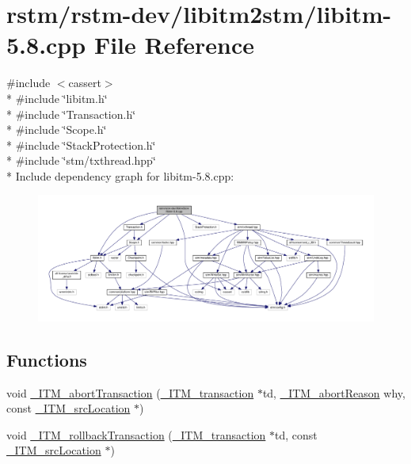 \hypertarget{libitm-5_88_8cpp}{\section{rstm/rstm-\/dev/libitm2stm/libitm-\/5.8.cpp File Reference}
\label{libitm-5_88_8cpp}
}
{\ttfamily \#include $<$cassert$>$}\\*
{\ttfamily \#include \char`\"{}libitm.\-h\char`\"{}}\\*
{\ttfamily \#include \char`\"{}Transaction.\-h\char`\"{}}\\*
{\ttfamily \#include \char`\"{}Scope.\-h\char`\"{}}\\*
{\ttfamily \#include \char`\"{}Stack\-Protection.\-h\char`\"{}}\\*
{\ttfamily \#include \char`\"{}stm/txthread.\-hpp\char`\"{}}\\*
Include dependency graph for libitm-\/5.8.cpp\-:
\nopagebreak
\begin{figure}[H]
\begin{center}
\leavevmode
\includegraphics[width=350pt]{libitm-5_88_8cpp__incl}
\end{center}
\end{figure}
\subsection*{Functions}
\begin{DoxyCompactItemize}
\item 
void \hyperlink{libitm-5_88_8cpp_a6de38352f37475854431a0525bf7d13b}{\-\_\-\-I\-T\-M\-\_\-abort\-Transaction} (\hyperlink{libitm_8h_a65d3a93d285fdbde408558d6b431abc8}{\-\_\-\-I\-T\-M\-\_\-transaction} $\ast$td, \hyperlink{libitm_8h_aa7db0003bd46a83a6552f2faa6125d33}{\-\_\-\-I\-T\-M\-\_\-abort\-Reason} why, const \hyperlink{struct__ITM__srcLocation}{\-\_\-\-I\-T\-M\-\_\-src\-Location} $\ast$)
\item 
void \hyperlink{libitm-5_88_8cpp_a2f53a3f31121b66a0ea19acd4095dfa6}{\-\_\-\-I\-T\-M\-\_\-rollback\-Transaction} (\hyperlink{libitm_8h_a65d3a93d285fdbde408558d6b431abc8}{\-\_\-\-I\-T\-M\-\_\-transaction} $\ast$td, const \hyperlink{struct__ITM__srcLocation}{\-\_\-\-I\-T\-M\-\_\-src\-Location} $\ast$)
\end{DoxyCompactItemize}


